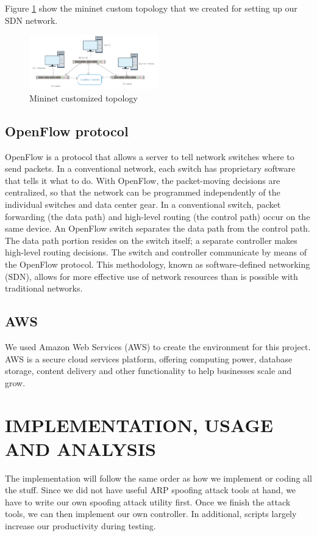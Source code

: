 \documentclass[conference]{IEEEtran}
\begin{document}
Figure \ref{fig:topology} show the mininet custom topology that we created for setting up our SDN network.

\begin{figure}[ht!]
\includegraphics[width=0.5\textwidth]{figure4.png}
\caption{Mininet customized topology}
\label{fig:topology}
\end{figure}



\subsection{OpenFlow protocol}
OpenFlow is a protocol that allows a server to tell network switches where to send packets. In a conventional network, each switch has proprietary software that tells it what to do. With OpenFlow, the packet-moving decisions are centralized, so that the network can be programmed independently of the individual switches and data center gear. In a conventional switch, packet forwarding (the data path) and high-level routing (the control path) occur on the same device. An OpenFlow switch separates the data path from the control path. The data path portion resides on the switch itself; a separate controller makes high-level routing decisions. The switch and controller communicate by means of the OpenFlow protocol. This methodology, known as software-defined networking (SDN), allows for more effective use of network resources than is possible with traditional networks.

\subsection{AWS}
We used Amazon Web Services (AWS) to create the environment for this project. AWS is a secure cloud services platform, offering computing power, database storage, content delivery and other functionality to help businesses scale and grow.

\section{IMPLEMENTATION, USAGE AND ANALYSIS}
The implementation will follow the same order as how we implement or coding all the stuff. Since we did not have useful ARP spoofing attack tools at hand, we have to write our own spoofing attack utility first. Once we finish the attack tools, we can then implement our own controller. In additional, scripts largely increase our productivity during testing. 
\end{document}
